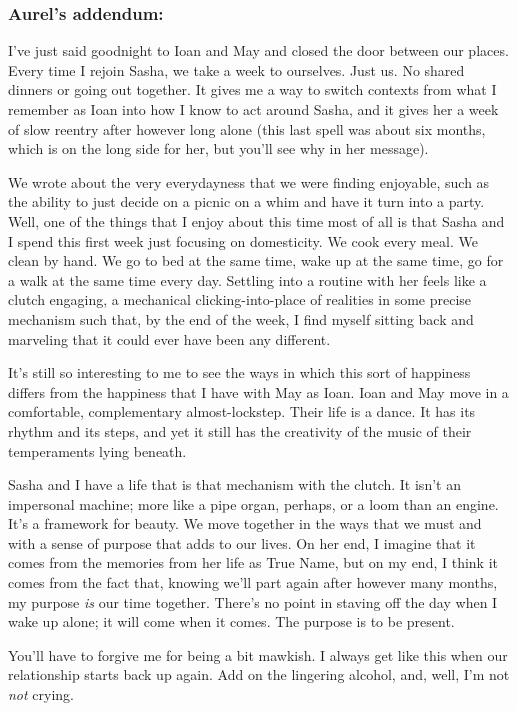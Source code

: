 \hypertarget{aurels-addendum}{%
\subsubsection{Aurel's addendum:}\label{aurels-addendum}}

I've just said goodnight to Ioan and May and closed the door between our places. Every time I rejoin Sasha, we take a week to ourselves. Just us. No shared dinners or going out together. It gives me a way to switch contexts from what I remember as Ioan into how I know to act around Sasha, and it gives her a week of slow reentry after however long alone (this last spell was about six months, which is on the long side for her, but you'll see why in her message).

We wrote about the very everydayness that we were finding enjoyable, such as the ability to just decide on a picnic on a whim and have it turn into a party. Well, one of the things that I enjoy about this time most of all is that Sasha and I spend this first week just focusing on domesticity. We cook every meal. We clean by hand. We go to bed at the same time, wake up at the same time, go for a walk at the same time every day. Settling into a routine with her feels like a clutch engaging, a mechanical clicking-into-place of realities in some precise mechanism such that, by the end of the week, I find myself sitting back and marveling that it could ever have been any different.

It's still so interesting to me to see the ways in which this sort of happiness differs from the happiness that I have with May as Ioan. Ioan and May move in a comfortable, complementary almost-lockstep. Their life is a dance. It has its rhythm and its steps, and yet it still has the creativity of the music of their temperaments lying beneath.

Sasha and I have a life that is that mechanism with the clutch. It isn't an impersonal machine; more like a pipe organ, perhaps, or a loom than an engine. It's a framework for beauty. We move together in the ways that we must and with a sense of purpose that adds to our lives. On her end, I imagine that it comes from the memories from her life as True Name, but on my end, I think it comes from the fact that, knowing we'll part again after however many months, my purpose \emph{is} our time together. There's no point in staving off the day when I wake up alone; it will come when it comes. The purpose is to be present.

You'll have to forgive me for being a bit mawkish. I always get like this when our relationship starts back up again. Add on the lingering alcohol, and, well, I'm not \emph{not} crying.

